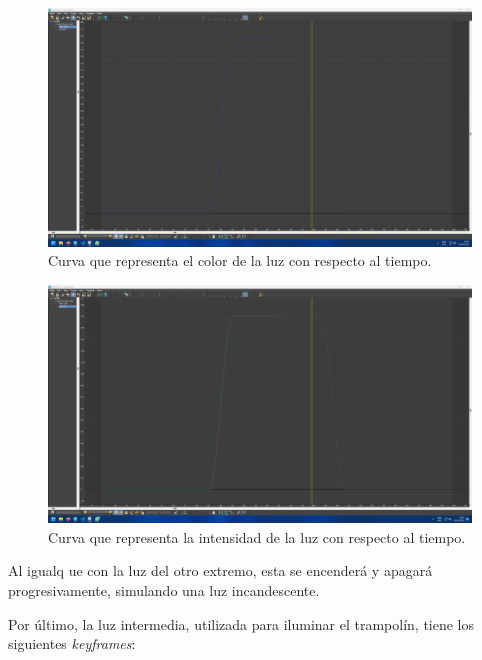 \documentclass{article}
\begin{document}
\begin{figure}[H]
    \centering
    \includegraphics[width=\textwidth]{imagenes/curvas/LR/filter.png}
    \caption{Curva que representa el color de la luz con respecto al tiempo.}
 \end{figure}

 \begin{figure}[H]
    \centering
    \includegraphics[width=\textwidth]{imagenes/curvas/LR/intensity.png}
    \caption{Curva que representa la intensidad de la luz con respecto al tiempo.}
 \end{figure}

Al igualq ue con la luz del otro extremo, esta se encenderá y apagará progresivamente, simulando una luz incandescente.


Por último, la luz intermedia, utilizada para iluminar el trampolín, tiene los siguientes \textit{keyframes}:
\end{document}
